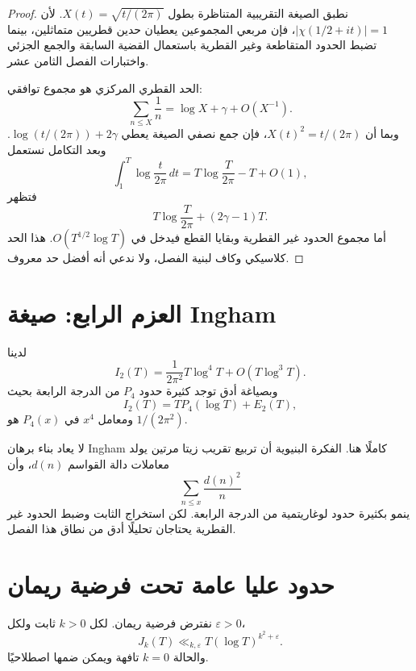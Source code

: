 \begin{proof}
نطبق الصيغة التقريبية المتناظرة بطول \(X(t)=\sqrt{t/(2\pi)}\). لأن \(|\chi(1/2+it)|=1\)، فإن مربعي المجموعين يعطيان حدين قطريين متماثلين، بينما تضبط الحدود المتقاطعة وغير القطرية باستعمال القضية السابقة والجمع الجزئي واختبارات الفصل الثامن عشر.

الحد القطري المركزي هو مجموع توافقي:
\[
\sum_{n\le X}\frac1n=\log X+\gamma+O(X^{-1}).
\]
وبما أن \(X(t)^2=t/(2\pi)\)، فإن جمع نصفي الصيغة يعطي \(\log(t/(2\pi))+2\gamma\). وبعد التكامل نستعمل
\[
\int_1^T\log\frac{t}{2\pi}\,dt
=T\log\frac{T}{2\pi}-T+O(1),
\]
فتظهر
\[
T\log\frac{T}{2\pi}+(2\gamma-1)T.
\]
أما مجموع الحدود غير القطرية وبقايا القطع فيدخل في
\(O(T^{1/2}\log T)\). هذا الحد كلاسيكي وكاف لبنية الفصل، ولا ندعي أنه أفضل حد معروف.
\end{proof}

\section{العزم الرابع: صيغة Ingham}

\begin{theorem}
\label{thm:ch22-fourth-moment}
لدينا
\[
I_2(T)
=
\frac{1}{2\pi^2}T\log^4T+O(T\log^3T).
\]
وبصياغة أدق توجد كثيرة حدود \(P_4\) من الدرجة الرابعة بحيث
\[
I_2(T)=TP_4(\log T)+E_2(T),
\]
ومعامل \(x^4\) في \(P_4(x)\) هو \(1/(2\pi^2)\).
\end{theorem}

لا يعاد بناء برهان Ingham كاملًا هنا. الفكرة البنيوية أن تربيع تقريب زيتا مرتين يولد معاملات دالة القواسم \(d(n)\)، وأن
\[
\sum_{n\le x}\frac{d(n)^2}{n}
\]
ينمو بكثيرة حدود لوغاريتمية من الدرجة الرابعة. لكن استخراج الثابت وضبط الحدود غير القطرية يحتاجان تحليلًا أدق من نطاق هذا الفصل.

\section{حدود عليا عامة تحت فرضية ريمان}

\begin{theorem}
\label{thm:ch22-soundararajan}
نفترض فرضية ريمان. لكل \(k>0\) ثابت ولكل \(\varepsilon>0\)،
\[
J_k(T)\ll_{k,\varepsilon}T(\log T)^{k^2+\varepsilon}.
\]
والحالة \(k=0\) تافهة ويمكن ضمها اصطلاحيًا.
\end{theorem}

